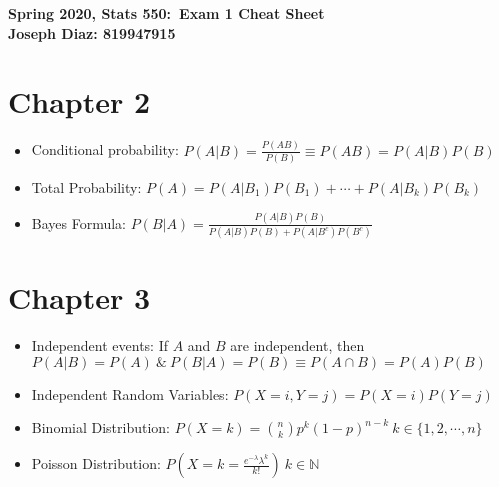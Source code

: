 \documentclass{article}
\begin{document}
	\begin{center}
		\textbf{Spring 2020, Stats 550:\ Exam 1 Cheat Sheet} \\
		\textbf{Joseph Diaz: 819947915}
	\end{center}
\noindent\makebox[\linewidth]{\rule{\paperwidth}{0.4pt}}

\section*{Chapter 2}
\begin{itemize}
	\item Conditional probability: $P(A|B) = \frac{P(AB)}{P(B)} \equiv P(AB) = P(A|B)P(B)$
	\item Total Probability: $P(A) = P(A|B_1)P(B_1) + \cdots  + P(A|B_k)P(B_k)$ 
	\item Bayes Formula: $P(B|A) = \frac{P(A|B)P(B)}{P(A|B)P(B) + P(A|B^c)P(B^c)}$
\end{itemize}
\section*{Chapter 3}
\begin{itemize}
	\item Independent events: If $A$ and $B$ are independent, then $P(A|B) = P(A)\ \&\ P(B|A) = P(B) \equiv P(A\cap B) = P(A)P(B)$
	\item Independent Random Variables: $P(X=i, Y=j) = P(X=i)P(Y=j)$
	\item Binomial Distribution: $P(X=k) = \binom{n}{k}p^k(1-p)^{n-k}\ k \in \{1,2, \cdots ,n\}$
	\item Poisson Distribution: $P(X=k = \frac{e^{-\lambda}\lambda^k}{k!})\ k \in \mathbb{N}$
\end{itemize}
\end{document}
